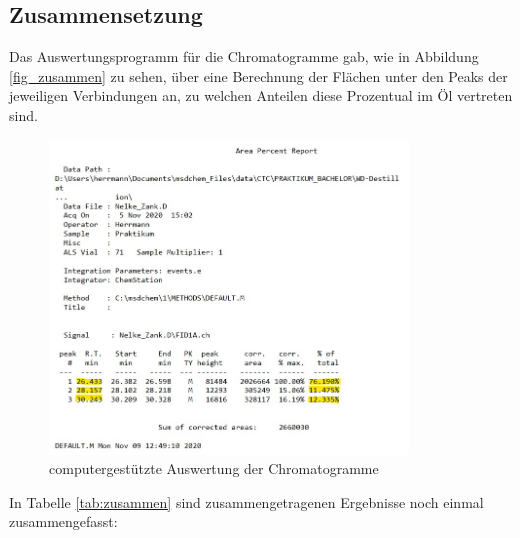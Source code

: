 \subsection*{Zusammensetzung}
Das Auswertungsprogramm für die Chromatogramme gab, wie in Abbildung \ref{fig_zusammen} zu sehen, über eine Berechnung der Flächen unter den Peaks der jeweiligen Verbindungen an, zu welchen Anteilen diese Prozentual im Öl vertreten sind.

\begin{figure}[h!]
	\centering
	\includegraphics[width=0.85\textwidth]{img/zusammen}
	\caption{computergestützte Auswertung der Chromatogramme}
	\label{fig:zusammen}
\end{figure}
\FloatBarrier

In Tabelle \ref{tab:zusammen} sind zusammengetragenen Ergebnisse noch einmal zusammengefasst:

\begin{table}[h!]
	\renewcommand*{\arraystretch}{1.2}
	\centering
	\caption{Zusammengefasste Ergebnisse der Gaschromatografie und der \mbox{Massenspektroskopie}}
	\label{tab:zusammen}
\end{table}%
\FloatBarrier




